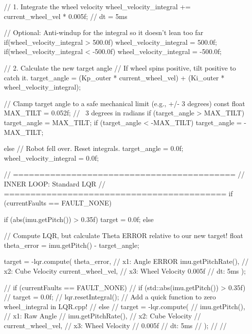 {{{            // 1. Integrate the wheel velocity
            wheel_velocity_integral += current_wheel_vel * 0.005f; // dt = 5ms
            
            // Optional: Anti-windup for the integral so it doesn't lean too far
            if(wheel_velocity_integral > 500.0f) wheel_velocity_integral = 500.0f;
            if(wheel_velocity_integral < -500.0f) wheel_velocity_integral = -500.0f;

            // 2. Calculate the new target angle
            // If wheel spins positive, tilt positive to catch it.
            target_angle = (Kp_outer * current_wheel_vel) + (Ki_outer * wheel_velocity_integral);
            
            // Clamp target angle to a safe mechanical limit (e.g., +/- 3 degrees)
            const float MAX_TILT = 0.052f; // ~3 degrees in radians
            if (target_angle > MAX_TILT) target_angle = MAX_TILT;
            if (target_angle < -MAX_TILT) target_angle = -MAX_TILT;

        } else {
            // Robot fell over. Reset integrals.
            target_angle = 0.0f;
            wheel_velocity_integral = 0.0f;
        }

        // ==========================================
        // INNER LOOP: Standard LQR
        // ==========================================
        if (currentFaults == FAULT_NONE) {
            if (abs(imu.getPitch()) > 0.35f) {
                target = 0.0f; 
            } else {
                // Compute LQR, but calculate Theta ERROR relative to our new target!
                float theta_error = imu.getPitch() - target_angle;
                
                    target = -lqr.compute(
                    theta_error,            // x1: Angle ERROR
                    imu.getPitchRate(),     // x2: Cube Velocity
                    current_wheel_vel,      // x3: Wheel Velocity
                    0.005f                  // dt: 5ms
                );
            }
        }
        // if (currentFaults == FAULT_NONE) {
        //     if (std::abs(imu.getPitch()) > 0.35f) {
        //         target = 0.0f; 
        //         lqr.resetIntegral(); // Add a quick function to zero wheel_integral in LQR.cpp!
        //     } else {
        //             target = -lqr.compute(
        //             imu.getPitch(),         // x1: Raw Angle
        //             imu.getPitchRate(),     // x2: Cube Velocity
        //             current_wheel_vel,      // x3: Wheel Velocity
        //             0.005f                  // dt: 5ms
        //         );
        //     }
        // }

}}
